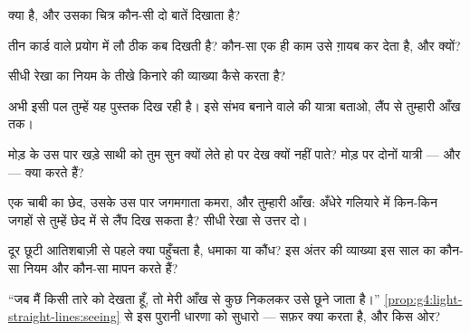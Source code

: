 \begin{exercise}[$\star$]\label{exo:g4:light-straight-lines:2}
 क्या है, और उसका चित्र कौन-सी दो बातें दिखाता है?
\end{exercise}

\begin{exercise}[$\star$]\label{exo:g4:light-straight-lines:3}
तीन कार्ड वाले प्रयोग में लौ ठीक कब दिखती है? कौन-सा एक ही काम उसे
ग़ायब कर देता है, और क्यों?
\end{exercise}

\begin{exercise}[$\star$]\label{exo:g4:light-straight-lines:4}
सीधी रेखा का नियम  के तीखे किनारे की व्याख्या कैसे करता है?
\end{exercise}

\begin{exercise}[$\star$]\label{exo:g4:light-straight-lines:5}
अभी इसी पल तुम्हें यह पुस्तक दिख रही है। इसे संभव बनाने वाले 
की यात्रा बताओ, लैंप से तुम्हारी आँख तक।
\end{exercise}

\begin{exercise}[$\star$]\label{exo:g4:light-straight-lines:6}
मोड़ के उस पार खड़े साथी को तुम सुन क्यों लेते हो पर देख क्यों नहीं
पाते? मोड़ पर दोनों यात्री ---  और  --- क्या करते हैं?
\end{exercise}

\begin{exercise}[$\star$]\label{exo:g4:light-straight-lines:7}
एक चाबी का छेद, उसके उस पार जगमगाता कमरा, और तुम्हारी आँख: अँधेरे
गलियारे में किन-किन जगहों से तुम्हें छेद में से लैंप दिख सकता है?
सीधी रेखा से उत्तर दो।
\end{exercise}

\begin{exercise}[$\star$]\label{exo:g4:light-straight-lines:8}
दूर छूटी आतिशबाज़ी से पहले क्या पहुँचता है, धमाका या कौंध? इस अंतर
की व्याख्या इस साल का कौन-सा नियम और कौन-सा मापन करते हैं?
\end{exercise}

\begin{exercise}[$\star$]\label{exo:g4:light-straight-lines:9}
``जब मैं किसी तारे को देखता हूँ, तो मेरी आँख से कुछ निकलकर उसे छूने
जाता है।'' \cref{prop:g4:light-straight-lines:seeing} से इस पुरानी
धारणा को सुधारो --- सफ़र क्या करता है, और किस ओर?
\end{exercise}

